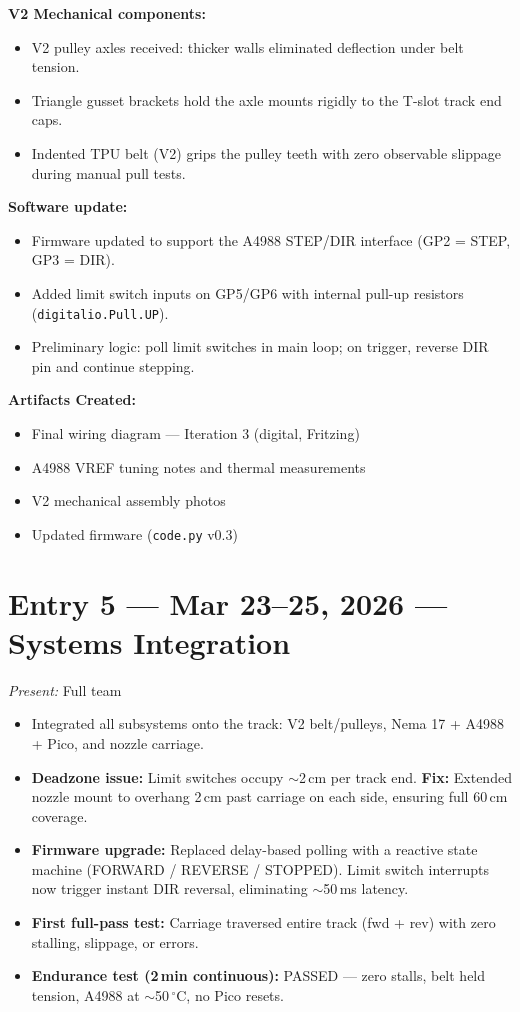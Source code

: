 \documentclass[12pt, letterpaper]{article}
\newcommand{\logentry}[2]{%
  \section{#1}%
  \textit{Present:} #2\par\vspace{1pt}%
}
\newcommand{\artifacts}{\par\vspace{1pt}\textbf{Artifacts Created:}\vspace{0pt}}
\begin{document}
\textbf{V2 Mechanical components:}
\begin{itemize}
  \item V2 pulley axles received: thicker walls eliminated deflection under belt tension.
  \item Triangle gusset brackets hold the axle mounts rigidly to the T-slot track end caps.
  \item Indented TPU belt (V2) grips the pulley teeth with zero observable slippage during manual pull tests.
\end{itemize}

\textbf{Software update:}
\begin{itemize}
  \item Firmware updated to support the A4988 STEP/DIR interface (GP2 = STEP, GP3 = DIR).
  \item Added limit switch inputs on GP5/GP6 with internal pull-up resistors (\texttt{digitalio.Pull.UP}).
  \item Preliminary logic: poll limit switches in main loop; on trigger, reverse DIR pin and continue stepping.
\end{itemize}

\artifacts
\begin{itemize}
  \item Final wiring diagram --- Iteration 3 (digital, Fritzing)
  \item A4988 VREF tuning notes and thermal measurements
  \item V2 mechanical assembly photos
  \item Updated firmware (\texttt{code.py} v0.3)
\end{itemize}

\logentry{Entry 5 \textnormal{---} Mar 23--25, 2026 \textnormal{---} Systems Integration}{Full team}

\begin{itemize}
  \item Integrated all subsystems onto the track: V2 belt/pulleys, Nema 17 + A4988 + Pico, and nozzle carriage.
  \item \textbf{Deadzone issue:} Limit switches occupy $\sim$2\,cm per track end. \textbf{Fix:} Extended nozzle mount to overhang 2\,cm past carriage on each side, ensuring full 60\,cm coverage.
  \item \textbf{Firmware upgrade:} Replaced delay-based polling with a reactive state machine (FORWARD / REVERSE / STOPPED). Limit switch interrupts now trigger instant DIR reversal, eliminating $\sim$50\,ms latency.
  \item \textbf{First full-pass test:} Carriage traversed entire track (fwd + rev) with zero stalling, slippage, or errors.
  \item \textbf{Endurance test (2\,min continuous):} PASSED --- zero stalls, belt held tension, A4988 at $\sim$50\,$^\circ$C, no Pico resets.
\end{itemize}
\end{document}
